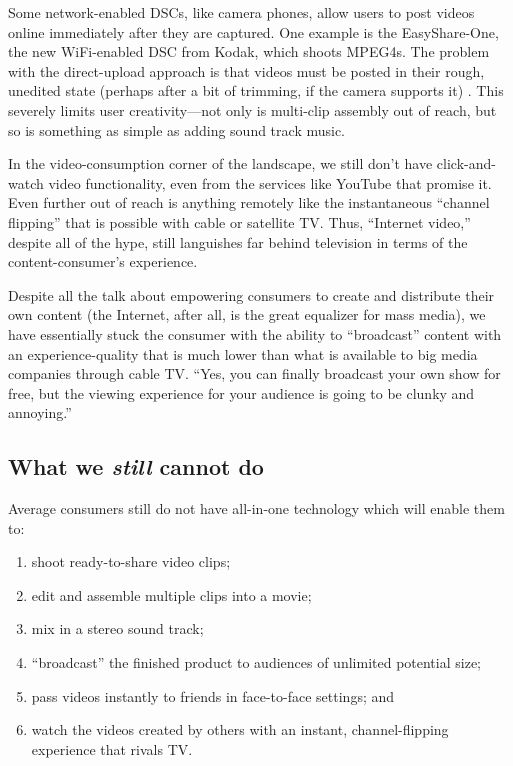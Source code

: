 \documentclass[12pt]{article}
\begin{document}
Some network-enabled DSCs, like camera phones, allow users to post videos online immediately after they are captured.
One example is the EasyShare-One, the new WiFi-enabled DSC from Kodak, which shoots MPEG4s.
The problem with the direct-upload approach is that videos must be posted in their rough, unedited state (perhaps after a bit of trimming, if the camera supports it) .
This severely limits user creativity---not only is multi-clip assembly out of reach, but so is something as simple as adding sound track music. 

In the video-consumption corner of the landscape, we still don't have click-and-watch video functionality, even from the services like YouTube that promise it.
Even further out of reach is anything remotely like the instantaneous ``channel flipping'' that is possible with cable or satellite TV.
Thus, ``Internet video,'' despite all of the hype, still languishes far behind television in terms of the content-consumer's experience.

Despite all the talk about empowering consumers to create and distribute their own content (the Internet, after all, is the great equalizer for mass media), we have essentially stuck the consumer with the ability to ``broadcast'' content with an experience-quality that is much lower than what is available to big media companies through cable TV.
``Yes, you can finally broadcast your own show for free, but the viewing experience for your audience is going to be clunky and annoying.''



\subsection{What we {\it still} cannot do}

Average consumers still do not have all-in-one technology which will enable them to:
\begin{enumerate}
\item shoot ready-to-share video clips;
\item edit and assemble multiple clips into a movie;
\item mix in a stereo sound track;
\item ``broadcast'' the finished product to audiences of unlimited potential size;
\item pass videos instantly to friends in face-to-face settings; and
\item watch the videos created by others with an instant, channel-flipping experience that rivals TV. 
\end{enumerate}
\end{document}
